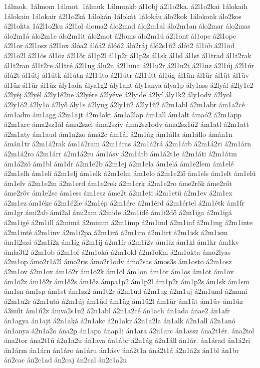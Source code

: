 {1álmok.
1álmom
1álmot.
1álmuk
1álmunkb
ál1obj
á2l1o2ka.
á2l1o2kai
1álokaih
1álokain
1álokair
á2l1o2ká
1álokán
1álokát
1álokáu
álo2kok
1álokonk
álo2kos
á2l1okta
1á2l1o2ku
á2l1ol
áloma2
álo2mad
álo2m1al
álo2m1an
álo2mar
álo2mas
álo2m1á
álo2m1e
álo2m1it
álo2mot
á2loms
álo2m1ú
á2l1ont
ál1opc
á2l1ope
á2l1or
á2l1osz
á2l1ox
álóa2
álóá2
álóó2
áló2ráj
áló2s1ű2
álót2
ál1öb
á2l1öd
á2l1ö2l
á2l1ös
ál1öz
á2l1őr
ál1p2l
ál1p2r
ál1p2s
ál1sk
ál1sl
ál1st
ál1trad
ál1t2rak
ál1t2ran
ál1t2re
ál1tré
á2l1ug
álu2n
á2l1una
á2l1u2r
á2l1u2t
á2l1uz
á2l1új
á2l1úr
álú2t
ál1útj
ál1útk
ál1útn
á2l1úto
á2l1útr
á2l1útt
ál1üg
ál1ün
ál1ür
ál1üt
ál1üv
ál1üz
ál1űr
ál1űz
ály1ada
álya1g2
ály1ant
ály1anya
álya1p
ály1ass
á2lyál
á2ly1e2
á2lyéj
á2lyél
á2ly1é2ne
á2lyére
á2lyéve
á2lyide
á2lyí
ály1k2
ály1odv
á2lyol
á2ly1ó2
á2ly1ö
á2lyő
ály1s
á2lyug
á2ly1ü2
á2ly1ű2
á2m1abl
á2m1abr
ám1a2cé
ám1adm
ám1agg
á2m1ajt
á2m1akt
ám1a2lap
ám1all
ám1alt
ámaó2
á2m1app
á2m1arc
áma2sz1ál
áma2szel
áma2szív
áma2sz1odv
áma2sz1ü2
ám1atl
á2m1att
á2m1aty
ám1aud
ám1a2zo
ámá2c
ám1áf
á2m1ág
ám1álla
ám1állo
ámán1n
ámán1tr
á2m1á2rak
ám1á2ram
á2m1áras
á2m1á2rá
á2m1árb
á2m1á2ri
á2m1árn
á2m1á2ro
á2m1árr
á2m1á2ru
ám1ásv
á2m1átb
ám1á2t1e
á2m1áti
á2m1átm
ám1á2zó
ám1bl
ám1dr
á2m1e2b
á2m1ej
á2m1ela
ám1elá
ám1e2lem
ám1elé
á2m1elh
ám1elí
á2m1elj
ám1elk
á2m1elm
ám1elo
á2m1e2lő
ám1els
ám1elt
ám1elü
ám1elv
á2m1e2m
á2m1erd
ám1e2rek
á2m1erk
á2m1e2ro
áme2rők
áme2rőt
áme2rőv
ám1e2se
ám1ess
ám1esz
áme2t
á2m1eti
á2m1etű
á2m1ev
á2m1ex
á2m1ez
ám1éke
á2m1é2le
á2m1ép
á2m1érc
á2m1érd
á2m1értel
á2m1étk
ám1fr
ám1gr
ámi2ab
ámi2al
ámi2am
á2mide
á2m1idé
ám1i2dő
á2m1iga
á2m1igá
á2m1igé
á2m1ill
á2mimá
á2mimm
á2m1imp
á2m1ind
á2m1inf
á2m1ing
á2m1inte
á2m1inté
á2m1inv
á2m1i2pa
á2m1irá
á2m1iro
á2m1irt
á2m1isk
á2m1ism
ám1i2szá
á2m1i2z
ám1íg
á2m1íj
á2m1ír
á2m1í2v
ám1íz
ám1kl
ám1kr
ám1kv
ámla3t2
á2m1ob
á2m1of
á2m1oká
á2m1okl
á2m1okm
á2m1okta
ámo2lyas
á2m1op
ámo2r1á2l
ámo2ris
ámo2r1odv
ámo2sas
ámos3s
ám1osto
á2m1osz
á2m1ov
á2m1ox
ám1ó2r
ám1ö2k
ám1öl
ám1ön
ám1ör
ám1ös
ám1öt
ám1öv
ám1ö2z
ám1ő2r
ám1ő2s
ám1őz
ámpa1p2
ám1p2l
ám1p2r
ám1p2s
ám1sk
ám1sm
ám1sn
ám1sp
ám1st
ám1sz2
ám1t2r
á2m1ud
á2m1ug
á2m1uj
á2m1und
á2muni
á2m1u2r
á2m1utá
á2m1új
ám1üd
ám1üg
ám1ü2l
ám1ür
ám1üt
ám1üv
ám1üz
á3műt
ám1ű2z
ámva2s1u2
á2n1abl
á2n1a2cé
án1ach
án1ada
ánae2
án1afr
án1agya
án1ajt
á2n1aká
á2n1akc
á2n1akr
á2n1a2la
án1alk
á2n1all
á2n1anó
án1anya
á2n1a2o
ána2p
án1apa
ánap1i
án1ara
á2n1arc
án1assz
ána2t1ér.
ána2tol
ána2tor
ána2t1ű
á2n1a2u
án1ava
án1ábr
á2n1ág
á2n1áll
án1ár.
án1árad
án1á2ri
án1árm
án1árn
án1áro
án1áru
án1ásv
áná2t1a
áná2t1á
á2n1á2z
án1bl
án1br
án2cac
án2c1ad
án2caj
án2cal
án2c1a2n
}
